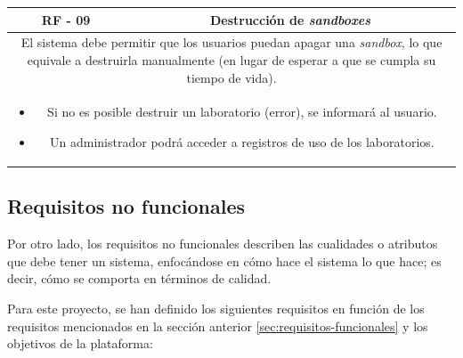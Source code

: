                 \begin{table}[!htbp]
                    \centering
                    \begin{tabular}{|c|c|}
                        \hline
                        \textbf{RF - 09} & \textbf{Destrucción de \textit{sandboxes}} \\
                        \hline
                        \multicolumn{2}{|p{15cm}|}{
                            El sistema debe permitir que los usuarios puedan apagar una \textit{sandbox}, lo que equivale a destruirla manualmente (en lugar de esperar a que se cumpla su tiempo de vida).
                        } \\
                        \hline
                        \multicolumn{2}{|p{15cm}|}{
                            \begin{itemize}
                                \item Si no es posible destruir un laboratorio (error), se informará al usuario.
                                \item Un administrador podrá acceder a registros de uso de los laboratorios.
                            \end{itemize}
                            } \\
                        \hline
                    \end{tabular}
                    \label{tab:RF09}
                \end{table}
                
                \newpage
        
        
        \subsection{Requisitos no funcionales}
            \label{sec:requisitos-nofuncionales}
            
            Por otro lado, los requisitos no funcionales describen las cualidades o atributos que debe tener un sistema, enfocándose en cómo hace el sistema lo que hace; es decir, cómo se comporta en términos de calidad.
            
            Para este proyecto, se han definido los siguientes requisitos en función de los requisitos mencionados en la sección anterior \ref{sec:requisitos-funcionales} y los objetivos de la plataforma:
            
